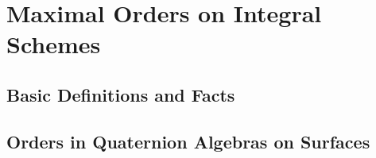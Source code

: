 \section{Maximal Orders on Integral Schemes}
\subsection{Basic Definitions and Facts}

\subsection{Orders in Quaternion Algebras on Surfaces}
